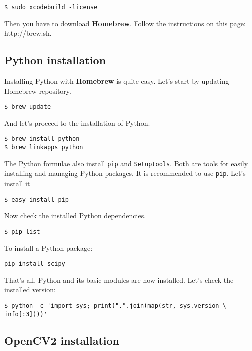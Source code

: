\documentclass[a4paper, 11pt]{article}
\begin{document}
\begin{verbatim}
$ sudo xcodebuild -license
\end{verbatim}

Then you have to download \textbf{Homebrew}. Follow the instructions on this page: http://brew.sh.

\subsection*{Python installation}

Installing Python with \textbf{Homebrew} is quite easy. Let's start by updating Homebrew repository.

\begin{verbatim}
$ brew update
\end{verbatim}

And let's proceed to the installation of Python.

\begin{verbatim}
$ brew install python
$ brew linkapps python
\end{verbatim}

The Python formulae also install \texttt{pip} and \texttt{Setuptools}. Both are tools for easily installing and managing Python packages. It is recommended to use \texttt{pip}. Let's install it

\begin{verbatim}
$ easy_install pip
\end{verbatim}

Now check the installed Python dependencies.

\begin{verbatim}
$ pip list
\end{verbatim}

To install a Python package:

\begin{verbatim}
pip install scipy
\end{verbatim}

That's all. Python and its basic modules are now installed. Let's check the installed version:

\begin{verbatim}
$ python -c 'import sys; print(".".join(map(str, sys.version_\
info[:3])))'
\end{verbatim}

\subsection*{OpenCV2 installation}
\end{document}
